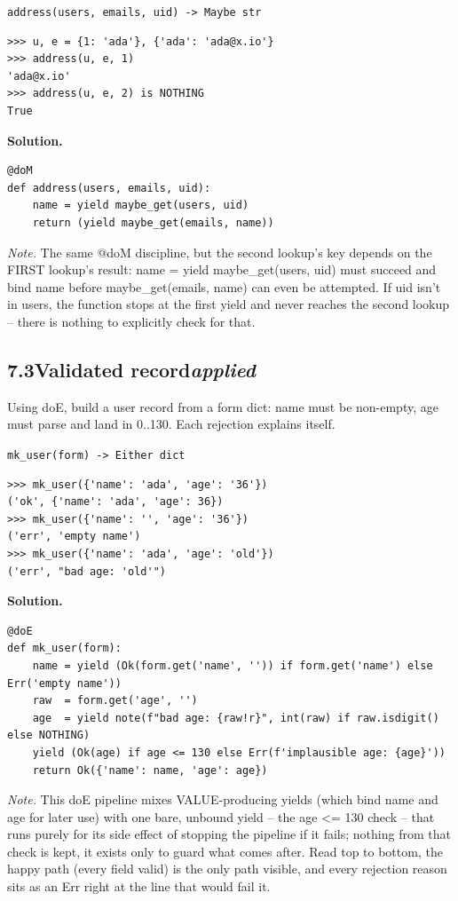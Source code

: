 \documentclass[10pt,letterpaper]{book}
\begin{document}
\noindent\texttt{address(users, emails, uid) -> Maybe str}
\begin{lstlisting}[style=ex]
>>> u, e = {1: 'ada'}, {'ada': 'ada@x.io'}
>>> address(u, e, 1)
'ada@x.io'
>>> address(u, e, 2) is NOTHING
True
\end{lstlisting}
\noindent\textbf{Solution.}
\begin{lstlisting}[style=code]
@doM
def address(users, emails, uid):
    name = yield maybe_get(users, uid)
    return (yield maybe_get(emails, name))
\end{lstlisting}
\noindent\textit{Note.} The same @doM discipline, but the second lookup's key depends on the FIRST lookup's result: name = yield maybe\_get(users, uid) must succeed and bind name before maybe\_get(emails, name) can even be attempted. If uid isn't in users, the function stops at the first yield and never reaches the second lookup -- there is nothing to explicitly check for that.

\subsection*{7.3\quad Validated record\hfill\textnormal{\textit{applied}}}
Using doE, build a user record from a form dict: name must be non-empty, age must parse and land in 0..130. Each rejection explains itself.

\noindent\texttt{mk\_user(form) -> Either dict}
\begin{lstlisting}[style=ex]
>>> mk_user({'name': 'ada', 'age': '36'})
('ok', {'name': 'ada', 'age': 36})
>>> mk_user({'name': '', 'age': '36'})
('err', 'empty name')
>>> mk_user({'name': 'ada', 'age': 'old'})
('err', "bad age: 'old'")
\end{lstlisting}
\noindent\textbf{Solution.}
\begin{lstlisting}[style=code]
@doE
def mk_user(form):
    name = yield (Ok(form.get('name', '')) if form.get('name') else Err('empty name'))
    raw  = form.get('age', '')
    age  = yield note(f"bad age: {raw!r}", int(raw) if raw.isdigit() else NOTHING)
    yield (Ok(age) if age <= 130 else Err(f'implausible age: {age}'))
    return Ok({'name': name, 'age': age})
\end{lstlisting}
\noindent\textit{Note.} This doE pipeline mixes VALUE-producing yields (which bind name and age for later use) with one bare, unbound yield -- the age <= 130 check -- that runs purely for its side effect of stopping the pipeline if it fails; nothing from that check is kept, it exists only to guard what comes after. Read top to bottom, the happy path (every field valid) is the only path visible, and every rejection reason sits as an Err right at the line that would fail it.
\end{document}
